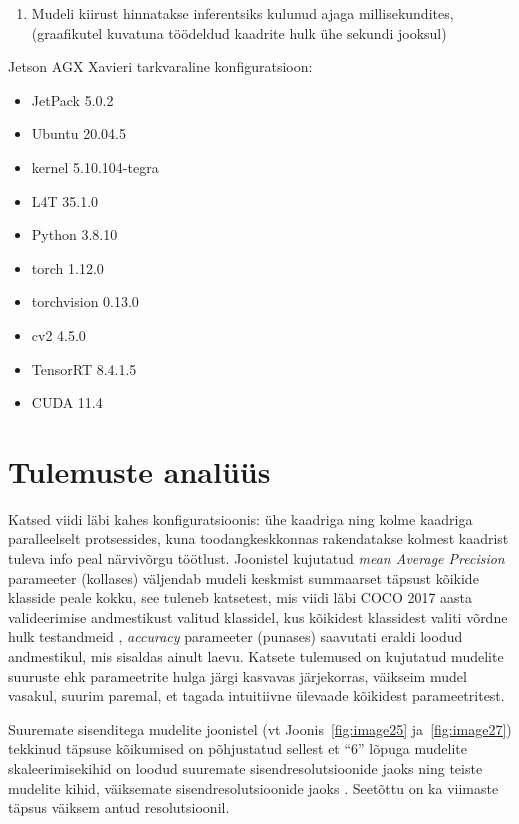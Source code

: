 \begin{enumerate}
\def\labelenumi{\arabic{enumi}.}
\setcounter{enumi}{4}
\tightlist
\item
  Mudeli kiirust hinnatakse inferentsiks kulunud ajaga millisekundites, (graafikutel kuvatuna töödeldud kaadrite hulk ühe sekundi jooksul)
\end{enumerate}

Jetson AGX Xavieri tarkvaraline konfiguratsioon:

\begin{itemize}
\item
  JetPack 5.0.2
\item
  Ubuntu 20.04.5
\item
  kernel 5.10.104-tegra
\item
  L4T 35.1.0
\item
  Python 3.8.10
\item
  torch 1.12.0
\item
  torchvision 0.13.0
\item
  cv2 4.5.0
\item
  TensorRT 8.4.1.5
\item
  CUDA 11.4
\end{itemize}

\section{Tulemuste analüüs}\label{tulemuste-analuxfcuxfcs}

Katsed viidi läbi kahes konfiguratsioonis: ühe kaadriga ning kolme kaadriga paralleelselt protsessides, kuna toodangkeskkonnas rakendatakse kolmest kaadrist tuleva info peal närvivõrgu töötlust. Joonistel kujutatud \emph{mean Average Precision} parameeter (kollases) väljendab mudeli keskmist summaarset täpsust kõikide klasside peale kokku, see tuleneb katsetest, mis viidi läbi COCO 2017 aasta valideerimise andmestikust valitud klassidel, kus kõikidest klassidest valiti võrdne hulk testandmeid \cite{ref64}, \emph{accuracy} parameeter (punases) saavutati eraldi loodud andmestikul, mis sisaldas ainult laevu. Katsete tulemused on kujutatud mudelite suuruste ehk parameetrite hulga järgi kasvavas järjekorras, väikseim mudel vasakul, suurim paremal, et tagada intuitiivne ülevaade kõikidest parameetritest.

Suuremate sisenditega mudelite joonistel (vt Joonis~\ref{fig:image25} ja~\ref{fig:image27}) tekkinud täpsuse kõikumised on põhjustatud sellest et ``6'' lõpuga mudelite skaleerimisekihid on loodud suuremate sisendresolutsioonide jaoks ning teiste mudelite kihid, väiksemate sisendresolutsioonide jaoks \cite{ref65}. Seetõttu on ka viimaste täpsus väiksem antud resolutsioonil.

